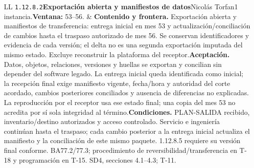 \begin{longtable}{L{\tabcolsep\relax}L{\tabcolsep\relax}}
\texttt{1.\allowbreak{}12.\allowbreak{}8.\allowbreak{}2}\newline{}\textbf{Exportación abierta y manifiestos de datos}\newline{}Nicolás Torfan\newline{}1 instancia.\newline{}\textbf{Ventana:} 53--56. & \textbf{Contenido y frontera.} Exportación abierta y manifiestos de transferencia: entrega inicial en mes 53 y actualización/conciliación de cambios hasta el traspaso autorizado de mes 56. Se conservan identificadores y evidencia de cada versión; el delta no es una segunda exportación imputada del mismo estado. Excluye reconstruir la plataforma del receptor.\newline{}\textbf{Aceptación.} Datos, objetos, relaciones, versiones y huellas se exportan y concilian sin depender del software legado. La entrega inicial queda identificada como inicial; la recepción final exige manifiesto vigente, fecha/hora y autoridad del corte acordado, cambios posteriores conciliados y ausencia de diferencias no explicadas. La reproducción por el receptor usa ese estado final; una copia del mes 53 no acredita por sí sola integridad al término.\newline{}\textbf{Condiciones.} PLAN-SALIDA recibido, inventario/destino autorizados y acceso controlado. Servicio e ingeniería continúan hasta el traspaso; cada cambio posterior a la entrega inicial actualiza el manifiesto y la conciliación de este mismo paquete. 1.12.8.5 requiere su versión final conforme. BA77.2/77.3; procedimiento de reversibilidad/transferencia en T-18 y programación en T-15. SD4, secciones 4.1--4.3; T-11.\\\hline

\end{longtable}
